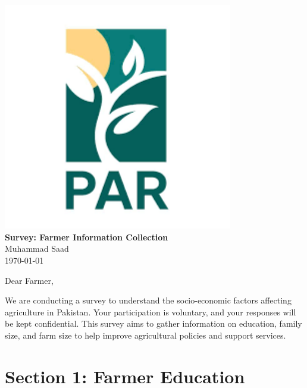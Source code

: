 \documentclass[12pt]{article}
\begin{document}
\begin{titlepage}
    \centering
    \vspace*{\fill} 
    \includegraphics[width=10cm]{img/logo2.png}\\[1cm]
    {\Large \textbf{Survey: Farmer Information Collection}}\\[0.5cm]
    {\large Muhammad Saad}\\[0.2cm]
    {\large \today}\\[0.5cm]
    \vspace*{\fill}
\end{titlepage}

\newpage

Dear Farmer,

We are conducting a survey to understand the socio-economic factors affecting agriculture in Pakistan. Your participation is voluntary, and your responses will be kept confidential. This survey aims to gather information on education, family size, and farm size to help improve agricultural policies and support services.

\section*{Section 1: Farmer Education}
\end{document}
